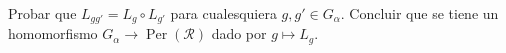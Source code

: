 \begin{ejercicio}
Probar que $L_{g g'} = L_g \circ L_{g'}$ para cualesquiera $g, g' \in G_\alpha$. Concluir que se tiene un homomorfismo $G_\alpha \to \operatorname{Per}(\mathcal{R})$ dado por $g \mapsto L_g$.
\end{ejercicio}

\begin{demostracion}

\end{demostracion}
